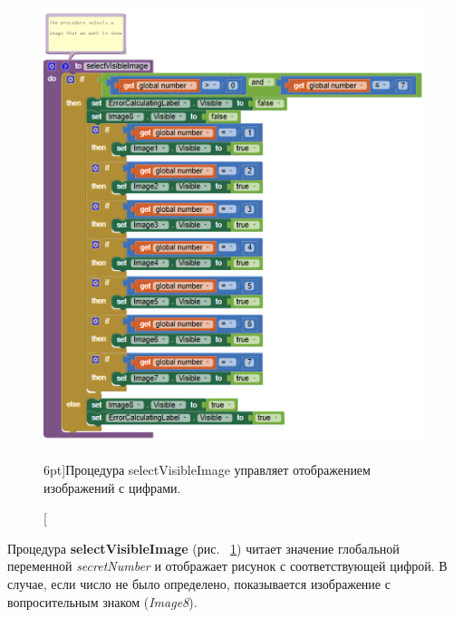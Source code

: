 \begin{figure}
  \includegraphics{./graphics/programs/guess_numbers/procedure_selectVisibleImage_AppInventor_2018.png}
    \caption[Процедура selectVisibleImage.][6pt]{Процедура selectVisibleImage управляет отображением изображений с цифрами.}
  \label{fig:block:click:select:visible:image}
\end{figure}

Процедура \textbf{selectVisibleImage} (рис. ~\ref{fig:block:click:select:visible:image}) читает значение глобальной переменной \textit{secretNumber} и отображает рисунок с соответствующей цифрой.
В случае, если число не было определено, показывается изображение с вопросительным знаком (\textit{Image8}).

